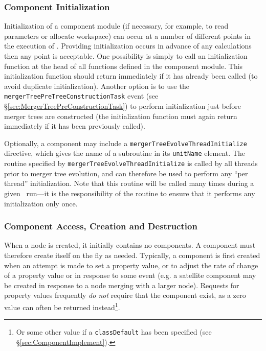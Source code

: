 \subsubsection{Component Initialization}

Initialization of a component module (if necessary, for example, to read parameters or allocate workspace) can occur at a number of different points in the execution of \glc. Providing initialization occurs in advance of any calculations then any point is acceptable. One possibility is simply to call an initialization function at the head of all functions defined in the component module. This initialization function should return immediately if it has already been called (to avoid duplicate initialization). Another option is to use the {\tt mergerTreePreTreeConstructionTask} event (see \S\ref{sec:MergerTreePreConstructionTask}) to perform initialization just before merger trees are constructed (the initialization function must again return immediately if it has been previously called).

Optionally, a component may include a {\tt mergerTreeEvolveThreadInitialize} directive, which gives the name of a subroutine in its {\tt unitName} element. The routine specified by {\tt mergerTreeEvolveThreadInitialize} is called by all threads prior to merger tree evolution, and can therefore be used to perform any ``per thread'' initialization. Note that this routine will be called many times during a given \glc\ run---it is the responsibility of the routine to ensure that it performs any initialization only once.

\subsubsection{Component Access, Creation and Destruction}

When a node is created, it initially contains no components. A component must therefore create itself on the fly as needed. Typically, a component is first created when an attempt is made to set a property value, or to adjust the rate of change of a property value or in response to some event (e.g. a satellite component may be created in response to a node merging with a larger node). Requests for property values frequently \emph{do not} require that the component exist, as a zero value can often be returned instead\footnote{Or some other value if a {\tt classDefault} has been specified (see \S\ref{sec:ComponentImplement}).}.

